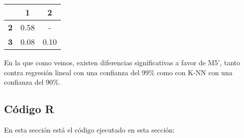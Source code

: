 \begin{table}[H]
\centering
\begin{tabular}{|c|c|c|}
\hline
\textbf{}  & \textbf{1} & \textbf{2} \\ \hline
\textbf{2} & 0.58      & -          \\ \hline
\textbf{3} & 0.08      & 0.10      \\ \hline
\end{tabular}%
\end{table}

En la que como vemos, existen diferencias significativas a favor de M5', tanto contra regresión lineal con una confianza del 99\% como con K-NN con una confianza del 90\%.

\subsection{Código R}

En esta sección está el código ejecutado en esta sección:

